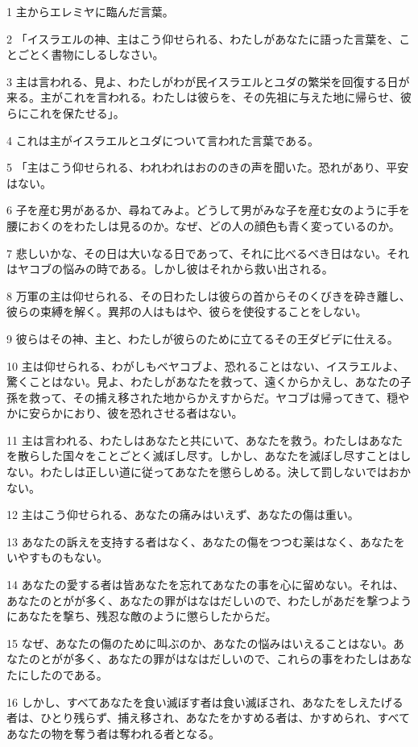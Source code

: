 \par 1 主からエレミヤに臨んだ言葉。
\par 2 「イスラエルの神、主はこう仰せられる、わたしがあなたに語った言葉を、ことごとく書物にしるしなさい。
\par 3 主は言われる、見よ、わたしがわが民イスラエルとユダの繁栄を回復する日が来る。主がこれを言われる。わたしは彼らを、その先祖に与えた地に帰らせ、彼らにこれを保たせる」。
\par 4 これは主がイスラエルとユダについて言われた言葉である。
\par 5 「主はこう仰せられる、われわれはおののきの声を聞いた。恐れがあり、平安はない。
\par 6 子を産む男があるか、尋ねてみよ。どうして男がみな子を産む女のように手を腰におくのをわたしは見るのか。なぜ、どの人の顔色も青く変っているのか。
\par 7 悲しいかな、その日は大いなる日であって、それに比べるべき日はない。それはヤコブの悩みの時である。しかし彼はそれから救い出される。
\par 8 万軍の主は仰せられる、その日わたしは彼らの首からそのくびきを砕き離し、彼らの束縛を解く。異邦の人はもはや、彼らを使役することをしない。
\par 9 彼らはその神、主と、わたしが彼らのために立てるその王ダビデに仕える。
\par 10 主は仰せられる、わがしもべヤコブよ、恐れることはない、イスラエルよ、驚くことはない。見よ、わたしがあなたを救って、遠くからかえし、あなたの子孫を救って、その捕え移された地からかえすからだ。ヤコブは帰ってきて、穏やかに安らかにおり、彼を恐れさせる者はない。
\par 11 主は言われる、わたしはあなたと共にいて、あなたを救う。わたしはあなたを散らした国々をことごとく滅ぼし尽す。しかし、あなたを滅ぼし尽すことはしない。わたしは正しい道に従ってあなたを懲らしめる。決して罰しないではおかない。
\par 12 主はこう仰せられる、あなたの痛みはいえず、あなたの傷は重い。
\par 13 あなたの訴えを支持する者はなく、あなたの傷をつつむ薬はなく、あなたをいやすものもない。
\par 14 あなたの愛する者は皆あなたを忘れてあなたの事を心に留めない。それは、あなたのとがが多く、あなたの罪がはなはだしいので、わたしがあだを撃つようにあなたを撃ち、残忍な敵のように懲らしたからだ。
\par 15 なぜ、あなたの傷のために叫ぶのか、あなたの悩みはいえることはない。あなたのとがが多く、あなたの罪がはなはだしいので、これらの事をわたしはあなたにしたのである。
\par 16 しかし、すべてあなたを食い滅ぼす者は食い滅ぼされ、あなたをしえたげる者は、ひとり残らず、捕え移され、あなたをかすめる者は、かすめられ、すべてあなたの物を奪う者は奪われる者となる。

